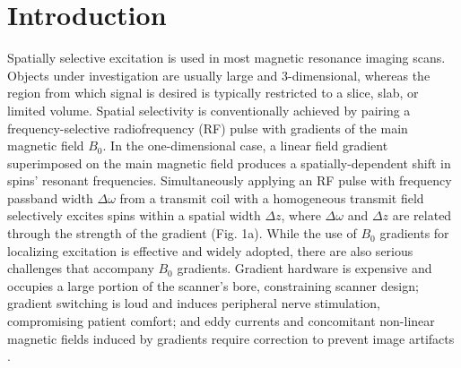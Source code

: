 \documentclass[a4paper,12pt]{article}
\begin{document}
\section*{Introduction}
Spatially selective excitation is used in most magnetic resonance imaging scans. 
Objects under investigation are usually large and 3-dimensional, 
whereas the region from which signal is desired is typically restricted to a slice, slab, or limited volume. 
Spatial selectivity is conventionally achieved by pairing a frequency-selective radiofrequency (RF) 
pulse with gradients of the main magnetic field $B_0$. 
In the one-dimensional case, 
a linear field gradient superimposed on the main magnetic field produces a spatially-dependent shift in spins' resonant frequencies.  %
Simultaneously applying an RF pulse with frequency passband width $\Delta\omega$ from a transmit coil with a homogeneous 
transmit field selectively excites spins within a spatial width $\Delta z$, where $\Delta \omega$ and $\Delta z$ are related through the strength of the gradient (Fig. 1a). 
While the use of $B_0$ gradients for localizing excitation is effective and widely adopted, 
there are also serious challenges that accompany $B_0$ gradients. 
Gradient hardware is expensive and occupies a large portion of the  scanner's bore, 
constraining scanner design; gradient switching is loud and induces peripheral nerve stimulation, 
compromising patient comfort; and eddy currents and concomitant non-linear magnetic fields induced by gradients require correction to prevent image artifacts \cite{Bernstein1998ConcomitantCorrection, Spees2011QuantificationGradients}.
\end{document}
